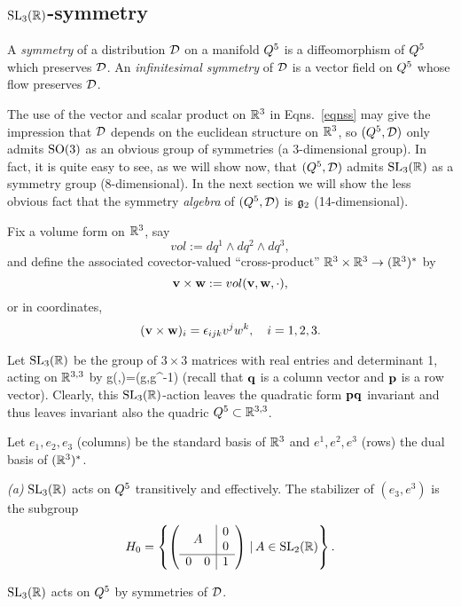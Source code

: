 \subsection{${\mathrm{SL}_3(\mathbb{R})}$-symmetry} \label{TwoFour}
A {\em symmetry} of a distribution ${\mathcal D}$ on a manifold $Q^5$  is a diffeomorphism of $Q^5$
 which preserves ${\mathcal D}$. An {\em infinitesimal symmetry} of ${\mathcal D}$  is a  vector field on $Q^5$ whose flow preserves ${\mathcal D}$. 


The use of the vector and scalar product on  $\mathbb{R}^3$ in Eqns.~\eqref{eqnss} may give the  impression that ${\mathcal D}$ depends on the euclidean structure on $\mathbb{R}^3$, so  $(Q^5,{\mathcal D})$ only admits $\mathrm{SO}(3)$ as  an obvious  group of symmetries (a 3-dimensional group). In fact, it is quite easy to see, as we will show now, that   $(Q^5,{\mathcal D})$   admits ${\mathrm{SL}_3(\mathbb{R})}$  as a symmetry group (8-dimensional). In the next section we will show the less obvious fact that  the symmetry {\em algebra} of $(Q^5,{\mathcal D})$ is ${\mathfrak{g}}_2$ (14-dimensional). 



Fix a volume form on $\mathbb{R}^3$, say $$vol:=dq^1\wedge dq^2\wedge dq^3,$$ and define the associated  covector-valued ``cross-product'' $\mathbb{R}^3\times \mathbb{R}^3\to(\mathbb{R}^3)^*$ by 
$${\mathbf v}\times {\mathbf w}:=vol({\mathbf v},{\mathbf w},\cdot),$$
or in coordinates, 
$$({\mathbf v}\times {\mathbf w})_i=\epsilon_{ijk}v^jw^k, \quad i=1,2,3.$$ 











Let ${\mathrm{SL}_3(\mathbb{R})}$ be the group of $3\times 3$ matrices with real entries and determinant 1, acting on  $\mathbb{R}^{3,3}$ by 
\be\label{action}
g\cdot (\q,\p)=(g\q,\p g^{-1})
\ee
 (recall that $\mathbf q$ is  a column vector and ${\mathbf p}$ is a row vector). Clearly, this ${\mathrm{SL}_3(\mathbb{R})}$-action leaves the quadratic form ${\mathbf p}\mathbf q$ invariant and thus leaves invariant also the quadric $Q^5\subset\mathbb{R}^{3,3}$.

Let $e_1,e_2,e_3$ (columns) be the standard basis of $\mathbb{R}^3$ and $e^1, e^2, e^3$ (rows) the dual basis of $(\mathbb{R}^3)^*$. 


\begin{proposition} \label{prop:sym} 
 {\em (a)} ${\mathrm{SL}_3(\mathbb{R})}$ acts on $Q^5$ transitively and effectively. The stabilizer of $(e_3, e^3)$ is the subgroup 
$$H_0=\left\{\left(\begin{array}{c|c}
A&\begin{matrix} 0\\ 0\end{matrix}\\
\hline
\begin{matrix}0& 0\end{matrix}&1
\end{array}
\right)\, | \,  A\in{\mathrm{SL}_2(\mathbb{R})}\right\}.$$


 ${\mathrm{SL}_3(\mathbb{R})}$ acts on $Q^5$ by symmetries of  ${\mathcal D}$. 
\end{proposition}

